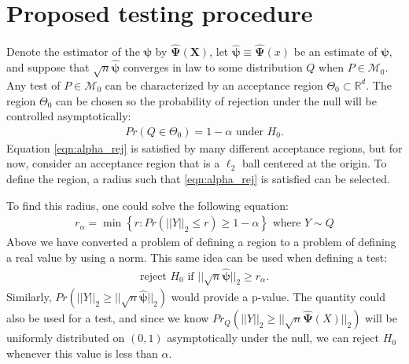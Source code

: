 \documentclass{article}
\newcommand{\rvo}{X}
\newcommand{\disto}{P}
\newcommand{\rvv}{Y}
\newcommand{\distv}{Q}
\begin{document}
\section{Proposed testing procedure}
\label{sec:prop_test_proc}
Denote the estimator of the $\boldsymbol{\psi}$ by $\hat{\boldsymbol{\Psi}}(\boldsymbol{\rvo})$, let $\hat{\boldsymbol{\psi}} \equiv \hat{\boldsymbol{\Psi}}(x)$ be an estimate of $\boldsymbol{\psi}$, and suppose that $\sqrt{n}\hat{\boldsymbol{\psi}}$ converges in law to some distribution $\distv$ when $\disto \in \mathscr{M}_0$.  Any test of $\disto \in \mathscr{M}_0$ can be characterized by an acceptance region $\Theta_0 \subset \mathbb{R}^d$. The region $\Theta_0$ can be chosen so the probability of rejection under the null will be controlled asymptotically:
\begin{align}
	Pr(\distv \in \Theta_0) = 1 - \alpha \text{ under } H_0. \label{eqn:alpha_rej}
\end{align}
Equation \eqref{eqn:alpha_rej} is satisfied by many different acceptance regions, but for now, consider an acceptance region that is a $\ell_2$ ball centered at the origin. To define the region, a radius such that \eqref{eqn:alpha_rej} is satisfied can be selected. 

To find this radius, one could solve the following equation:
\begin{align*}
	r_\alpha = \min\left\{r : Pr(||\rvv||_2 \leq r) \geq 1 - \alpha \right\} \text{ where } \rvv \sim \distv 
\end{align*}
Above we have converted a problem of defining a region to a problem of defining a real value by using a norm.  This same idea can be used when defining a test:
\begin{align*}
	\text{reject } H_0 \text{ if } ||\sqrt{n} \hat{\boldsymbol{\psi}}||_2 \geq r_\alpha.
\end{align*}
Similarly, $Pr(||\rvv||_2 \geq ||\sqrt{n} \hat{\boldsymbol{\psi}}||_2)$ would provide a p-value. The quantity could also be used for a test, and since we know $Pr_Q(||\rvv||_2 \geq ||\sqrt{n} \hat{\boldsymbol{\Psi}}(\rvo)||_2)$ will be uniformly distributed on $(0, 1)$ asymptotically under the null, we can reject $H_0$ whenever this value is less than $\alpha$.


\end{document}
